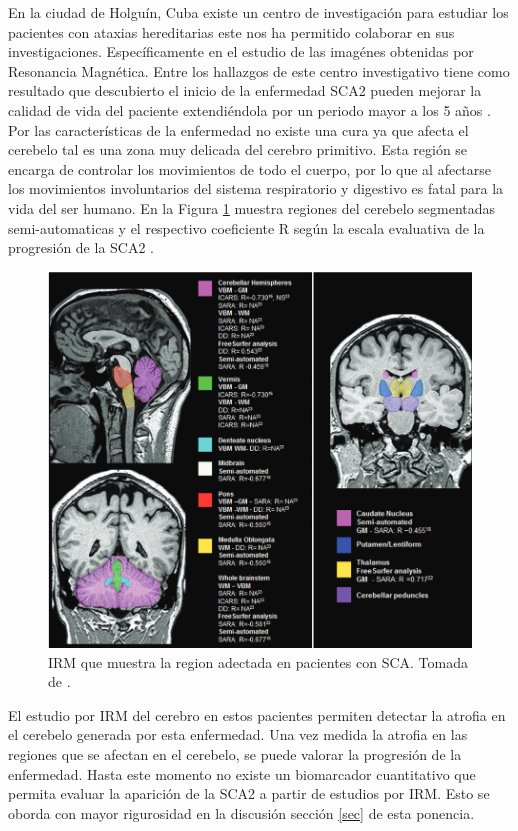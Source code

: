 \documentclass[a4paper,12pt]{article}
\begin{document}
En la ciudad de Holguín, Cuba existe un centro de investigación para estudiar los pacientes con ataxias hereditarias este nos ha permitido colaborar en sus investigaciones. Específicamente en el estudio de las imagénes obtenidas por Resonancia Magnética. Entre los hallazgos de este centro investigativo tiene como resultado que descubierto el inicio de la enfermedad SCA2 pueden mejorar la calidad de vida del paciente extendiéndola por un periodo mayor a los 5 años \cite{luis_velazquez_perez_ataxia_2012}. Por las características de la enfermedad no existe una cura ya que afecta el cerebelo tal es una zona muy delicada del cerebro primitivo. Esta región se encarga de controlar los movimientos de todo el cuerpo, por lo que al afectarse los movimientos  involuntarios del sistema respiratorio y digestivo es fatal para la vida del ser humano. En la Figura \ref{fig1} muestra regiones del cerebelo segmentadas semi-automaticas y el respectivo coeficiente R según la escala evaluativa de la progresión de la SCA2 \cite{klaes_mr_2016}.  

\begin{figure}[h]
 	\includegraphics[scale=0.5]{resonanciamarcada.png}
 	\caption{IRM que muestra la region adectada en pacientes con SCA. Tomada de \cite{klaes_mr_2016}.}
 	\label{fig1}	
\end{figure} 

El estudio por IRM del cerebro en estos pacientes permiten detectar la atrofia en el cerebelo generada por esta enfermedad. Una vez medida la atrofia en las regiones que se afectan en el cerebelo, se puede valorar la progresión de la enfermedad. Hasta este momento no existe un biomarcador cuantitativo que permita evaluar la aparición de la SCA2 a partir de estudios por IRM. Esto se oborda con mayor rigurosidad en la discusión sección \ref{sec} de esta ponencia.                       
\end{document}
